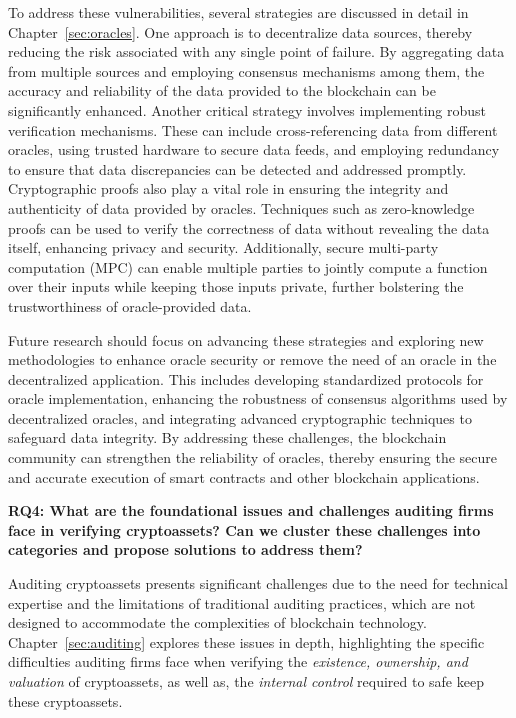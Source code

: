 To address these vulnerabilities, several strategies are discussed in detail in Chapter~\ref{sec:oracles}. One approach is to decentralize data sources, thereby reducing the risk associated with any single point of failure. By aggregating data from multiple sources and employing consensus mechanisms among them, the accuracy and reliability of the data provided to the blockchain can be significantly enhanced. Another critical strategy involves implementing robust verification mechanisms. These can include cross-referencing data from different oracles, using trusted hardware to secure data feeds, and employing redundancy to ensure that data discrepancies can be detected and addressed promptly. Cryptographic proofs also play a vital role in ensuring the integrity and authenticity of data provided by oracles. Techniques such as zero-knowledge proofs can be used to verify the correctness of data without revealing the data itself, enhancing privacy and security. Additionally, secure multi-party computation (MPC) can enable multiple parties to jointly compute a function over their inputs while keeping those inputs private, further bolstering the trustworthiness of oracle-provided data.

Future research should focus on advancing these strategies and exploring new methodologies to enhance oracle security or remove the need of an oracle in the decentralized application. This includes developing standardized protocols for oracle implementation, enhancing the robustness of consensus algorithms used by decentralized oracles, and integrating advanced cryptographic techniques to safeguard data integrity. By addressing these challenges, the blockchain community can strengthen the reliability of oracles, thereby ensuring the secure and accurate execution of smart contracts and other blockchain applications.



\textbf{RQ4: What are the foundational issues and challenges auditing firms face in verifying cryptoassets? Can we cluster these challenges into categories and propose solutions to address them?}

Auditing cryptoassets presents significant challenges due to the need for technical expertise and the limitations of traditional auditing practices, which are not designed to accommodate the complexities of blockchain technology. Chapter~\ref{sec:auditing} explores these issues in depth, highlighting the specific difficulties auditing firms face when verifying the \textit{existence, ownership, and valuation} of cryptoassets, as well as, the \textit{internal control} required to safe keep these cryptoassets.

